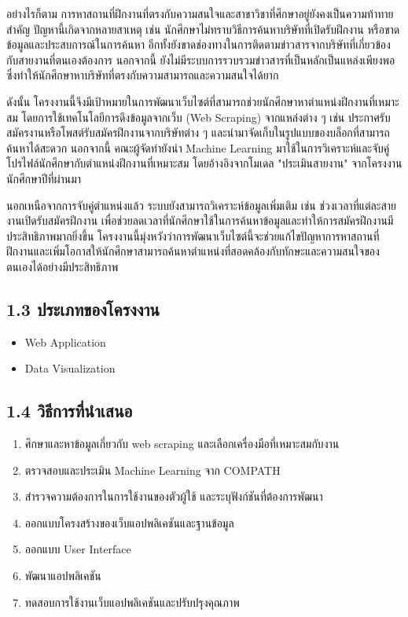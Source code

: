\documentclass[12pt,oneside,a4paper]{article}
\begin{document}
อย่างไรก็ตาม การหาสถานที่ฝึกงานที่ตรงกับความสนใจและสาขาวิชาที่ศึกษาอยู่ยังคงเป็นความท้าทายสำคัญ ปัญหานี้เกิดจากหลายสาเหตุ เช่น นักศึกษาไม่ทราบวิธีการค้นหาบริษัทที่เปิดรับฝึกงาน หรือขาดข้อมูลและประสบการณ์ในการค้นหา อีกทั้งยังขาดช่องทางในการติดตามข่าวสารจากบริษัทที่เกี่ยวข้องกับสายงานที่ตนเองต้องการ นอกจากนี้ ยังไม่มีระบบการรวบรวมข่าวสารที่เป็นหลักเป็นแหล่งเพียงพอ ซึ่งทำให้นักศึกษาหาบริษัทที่ตรงกับความสามารถและความสนใจได้ยาก

ดังนั้น โครงงานนี้จึงมีเป้าหมายในการพัฒนาเว็บไซต์ที่สามารถช่วยนักศึกษาหาตำแหน่งฝึกงานที่เหมาะสม โดยการใช้เทคโนโลยีการดึงข้อมูลจากเว็บ (Web Scraping) จากแหล่งต่าง ๆ เช่น ประกาศรับสมัครงานหรือโพสต์รับสมัครฝึกงานจากบริษัทต่าง ๆ และนำมาจัดเก็บในรูปแบบของบล็อกที่สามารถค้นหาได้สะดวก นอกจากนี้ คณะผู้จัดทำยังนำ Machine Learning มาใช้ในการวิเคราะห์และจับคู่โปรไฟล์นักศึกษากับตำแหน่งฝึกงานที่เหมาะสม โดยอ้างอิงจากโมเดล "ประเมินสายงาน" จากโครงงานนักศึกษาปีที่ผ่านมา

นอกเหนือจากการจับคู่ตำแหน่งแล้ว ระบบยังสามารถวิเคราะห์ข้อมูลเพิ่มเติม เช่น ช่วงเวลาที่แต่ละสายงานเปิดรับสมัครฝึกงาน เพื่อช่วยลดเวลาที่นักศึกษาใช้ในการค้นหาข้อมูลและทำให้การสมัครฝึกงานมีประสิทธิภาพมากยิ่งขึ้น โครงงานนี้มุ่งหวังว่าการพัฒนาเว็บไซต์นี้จะช่วยแก้ไขปัญหาการหาสถานที่ฝึกงานและเพิ่มโอกาสให้นักศึกษาสามารถค้นหาตำแหน่งที่สอดคล้องกับทักษะและความสนใจของตนเองได้อย่างมีประสิทธิภาพ


\subsection{1.3 ประเภทของโครงงาน}
\begin{itemize}
    \item Web Application
    \item Data Visualization
\end{itemize}

\subsection{1.4 วิธีการที่นำเสนอ}
\begin{enumerate}
    \item ศึกษาและหาข้อมูลเกี่ยวกับ web scraping และเลือกเครื่องมือที่เหมาะสมกับงาน
    \item ตรวจสอบและประเมิน Machine Learning จาก COMPATH
    \item สำรวจความต้องการในการใช้งานของตัวผู้ใช้ และระบุฟังก์ชันที่ต้องการพัฒนา
    \item ออกแบบโครงสร้างของเว็บแอปพลิเคชันและฐานข้อมูล
    \item ออกแบบ User Interface
    \item พัฒนาแอปพลิเคชัน
    \item ทดสอบการใช้งานเว็บแอปพลิเคชันและปรับปรุงคุณภาพ
\end{enumerate}
\end{document}
